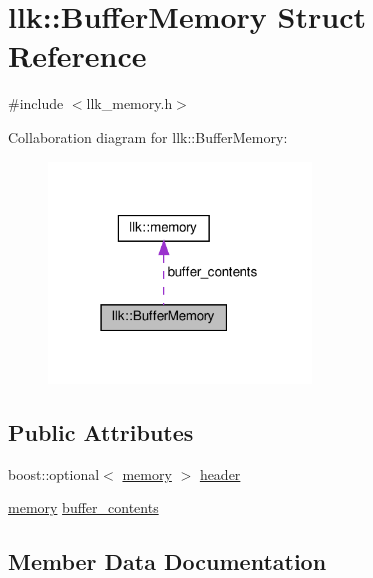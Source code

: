 \hypertarget{structllk_1_1BufferMemory}{}\section{llk\+:\+:Buffer\+Memory Struct Reference}
\label{structllk_1_1BufferMemory}


{\ttfamily \#include $<$llk\+\_\+memory.\+h$>$}



Collaboration diagram for llk\+:\+:Buffer\+Memory\+:\nopagebreak
\begin{figure}[H]
\begin{center}
\leavevmode
\includegraphics[width=198pt]{structllk_1_1BufferMemory__coll__graph}
\end{center}
\end{figure}
\subsection*{Public Attributes}
\begin{DoxyCompactItemize}
\item 
boost\+::optional$<$ \hyperlink{classllk_1_1memory}{memory} $>$ \hyperlink{structllk_1_1BufferMemory_a1d36015b797463afc7527cbb22f5a31e}{header}
\item 
\hyperlink{classllk_1_1memory}{memory} \hyperlink{structllk_1_1BufferMemory_a0603bea5cb9a94a719d79d49ffe0969c}{buffer\+\_\+contents}
\end{DoxyCompactItemize}


\subsection{Member Data Documentation}
\mbox{\label{structllk_1_1BufferMemory_a0603bea5cb9a94a719d79d49ffe0969c}} 

